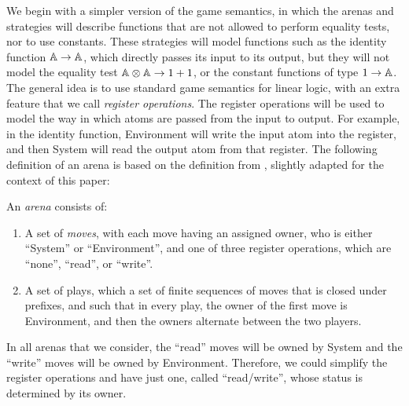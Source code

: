 \documentclass[a4paper,UKenglish,cleveref, autoref, numberwithinsect, thm-restate]{lipics-v2021}
\begin{document}
We begin with a simpler version of the game semantics, in which the arenas and strategies will describe functions that are not allowed to perform equality tests, nor to use constants. These strategies will model functions such as the identity function $\mathbb A \to \mathbb A$, which directly passes its input to its output, but they  will not model the equality test $\mathbb A \otimes \mathbb A \to 1 + 1$, or the constant functions of type $1 \to \mathbb A$. The general idea is to use standard game semantics for linear logic, with an extra feature that we call \emph{register operations}. The register operations will be used to model the way in which atoms are passed from the input to output. For example, in the identity function,  Environment will write the input atom into the register, and then System will read the output atom from that register. The following definition of an arena is based on the definition from \cite[p.~4]{abramsky2013semantics}, slightly
adapted for the context of this paper:
\begin{definition}[Arena] \label{def:arena}
    An \emph{arena} consists of:
    \begin{enumerate}
        \item A set of \emph{moves}, with each move having an assigned owner, who is either ``System'' or ``Environment'', and one of three register operations, which are ``none'', ``read'', or ``write''.
                \item A set of plays, which a set of finite sequences of moves that is closed under prefixes, and such that in every play, the owner of the first move is Environment, and then the owners alternate between the two players.
    \end{enumerate}
\end{definition}
\begin{remark}\label{rem:read-write}
    In all arenas that we consider, the ``read'' moves will be owned by System and the ``write'' moves will be owned by Environment. Therefore, we could simplify the register operations and have just one, called ``read/write'', whose status is determined by its owner. 
\end{remark}
\end{document}
